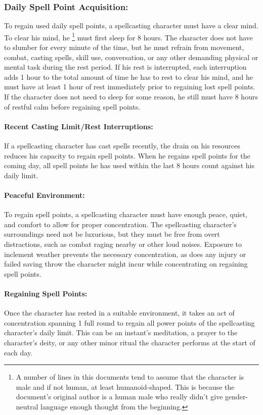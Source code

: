 \subsubsection{Daily Spell Point Acquisition:}
\label{sec:DailySpellPointAcquisition}
To regain used daily spell points, a spellcasting character must have a clear mind. 
To clear his mind, he \footnote{A number of lines in this documents tend to assume that the character is male and if not human, at least humanoid-shaped.
This is because the document's original author is a human male who really didn't give gender-neutral language enough thought from the beginning.} must first sleep for 8 hours.
The character does not have to slumber for every minute of the time, but he must refrain from movement, combat, casting spells, skill use, conversation, or any other demanding physical or mental task during the rest period. 
If his rest is interrupted, each interruption adds 1 hour to the total amount of time he has to rest to clear his mind, and he must have at least 1 hour of rest immediately prior to regaining lost spell points. 
If the character does not need to sleep for some reason, he still must have 8 hours of restful calm before regaining spell points.

\paragraph{Recent Casting Limit/Rest Interruptions:} If a spellcasting character has cast spells recently, the drain on his resources reduces his capacity to regain spell points. 
When he regains spell points for the coming day, all spell points he has used within the last 8 hours count against his daily limit.

\paragraph{Peaceful Environment:} To regain spell points, a spellcasting character must have enough peace, quiet, and comfort to allow for proper concentration. 
The spellcasting character's surroundings need not be luxurious, but they must be free from overt distractions, such as combat raging nearby or other loud noises. 
Exposure to inclement weather prevents the necessary concentration, as does any injury or failed saving throw the character might incur while concentrating on regaining spell points.

\paragraph{Regaining Spell Points:} Once the character has rested in a suitable environment, it takes an act of concentration spanning 1 full round to regain all power points of the spellcasting character's daily limit. 
This can be an instant's meditation, a prayer to the character's deity, or any other minor ritual the character performs at the start of each day.

